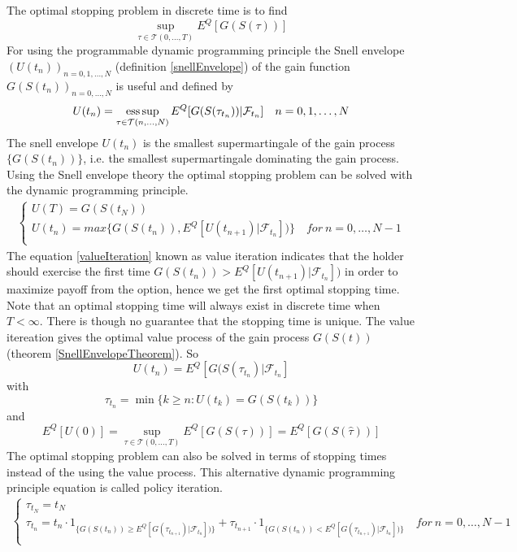 The optimal stopping problem in discrete time is to find
\begin{equation}\label{Bermudanstop1}
\sup_{\tau \in \mathcal{T}(0,\ldots,T)} E^Q[G(S(\tau))]
\end{equation}
For using the programmable dynamic programming principle the Snell envelope $(U(t_{n}))_{n=0,1,\ldots, N}$ (definition \ref{snellEnvelope}) of the gain function $G(S(t_n))_{n=0,\ldots,N}$ is useful and defined by
$$U(t_n)=\operatorname*{ess\,sup}_{\tau \in \mathcal{T}(n,\ldots, N)} E^Q[G(S(\tau_{t_n}))|\mathcal{F}_{t_n}] \quad n=0,1, \ldots, N$$
The snell envelope $U(t_n)$ is the smallest supermartingale of the gain process $\{G(S(t_n))\}$, i.e. the smallest supermartingale dominating the gain process. Using the Snell envelope theory the optimal stopping problem can be solved with the dynamic programming principle.
\begin{equation}\label{valueIteration}
\begin{split}
\begin{cases}
          U(T) = G(S(t_N))\\
          U(t_n) = max\{ G(S(t_n)), E^Q[U(t_{n+1})|\mathcal{F}_{t_n}])\} \quad for \ n={0,\ldots,N-1} \\ 
\end{cases}
\end{split}
\end{equation}
The equation \eqref{valueIteration} known as value iteration indicates that the holder should exercise the first time $G(S(t_n))> E^Q[U(t_{n+1})|\mathcal{F}_{t_n}])$ in order to maximize payoff from the option, hence we get the first optimal stopping time. Note that an optimal stopping time will always exist in discrete time when $T<\infty$. There is though no guarantee that the stopping time is unique. The value itereation gives the optimal value process of the gain process $G(S(t))$ (theorem \ref{SnellEnvelopeTheorem}). So 
$$U(t_n)=E^Q[G(S(\tau_{t_n})|\mathcal{F}_{t_n}]$$ with 
$$\tau_{t_n}=\min \{ k \geq n : U(t_k)=G(S(t_k)) \}$$ and 
$$E^Q[U(0)]= \sup_{\tau \in \mathcal{T}(0,\ldots, T)} E^Q[G(S(\tau))]=E^Q[G(S(\hat{\tau}))]$$ 
The optimal stopping problem can also be solved in terms of stopping times instead of the using the value process. This alternative dynamic programming principle equation is called policy iteration.
\begin{equation}\label{policyIteration}
\begin{split}
\begin{cases}
          \tau_{t_N} = t_N\\
          \tau_{t_n} = t_n \cdot 1_{\{G(S(t_n)) \geq E^Q[G(\tau_{t_{n+1}})|\mathcal{F}_{t_n}])\}} + \tau_{t_{n+1}} \cdot 1_{\{G(S(t_n)) < E^Q[G(\tau_{t_{n+1}})|\mathcal{F}_{t_n}])\}} \quad for \ n={0,\ldots,N-1} \\ 
\end{cases}
\end{split}
\end{equation}

